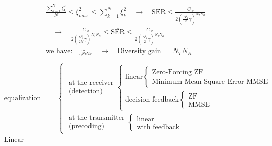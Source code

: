 \begin{align*}
	& \frac{\sum\limits_{k=1}^N\xi_k^2}{N}\le\xi_{max}^2\le\sum\limits_{k=1}^N\xi_k^2\quad\rightarrow\quad\overline{\mathrm{SER}}\le\frac{C_\mathcal{A}}{2\left(\frac{D_\mathcal{A}^2}{2}\gamma\right)^{N_TN_R}} \\
	& \quad\rightarrow\quad\frac{C_\mathcal{A}}{2\left(\frac{D_\mathcal{A}^2}{2N}\gamma\right)^{N_TN_R}}\le\overline{\mathrm{SER}}\le\frac{C_\mathcal{A}}{2\left(\frac{D_\mathcal{A}^2}{2}\gamma\right)^{N_TN_R}} \\
	& \text{we have: }\frac{\ldots}{\ldots\gamma^{N_TN_R}}\quad\rightarrow\quad\text{Diversity gain $=N_TN_R$} \\
\end{align*}
\begin{align*}
	& \text{equalization}
	& \begin{cases}
		\substack{\text{at the receiver}\\ \text{(detection)}} 
			\begin{cases}
				\text{linear} 
					\begin{cases}
						\text{Zero-Forcing ZF} \\
						\text{Minimum Mean Square Error MMSE}
					\end{cases} \\
				\text{decision feedback}
					\begin{cases}
						\text{ZF} \\
						\text{MMSE}
					\end{cases}
			\end{cases} \\
		\substack{\text{at the transmitter}\\ \text{(precoding)}}
			\begin{cases}
				\text{linear} \\
				\text{with feedback}
			\end{cases}
	\end{cases} \\
	& \text{Linear equalizer:} \\
\end{align*}